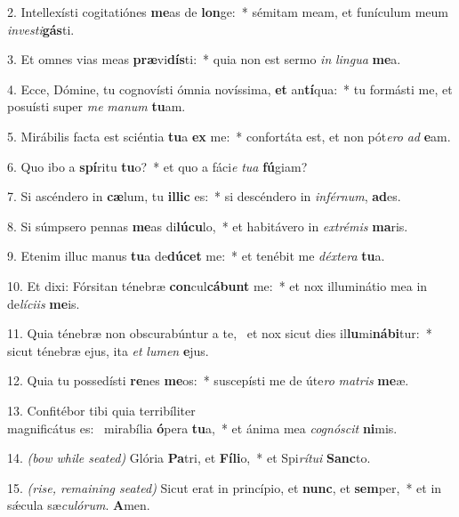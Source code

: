 	2. Intellexísti cogitatiónes \textbf{me}as de \textbf{lon}ge:~* sémitam meam, et funículum meum\\ \textit{in}\textit{ves}\textit{ti}\textbf{gás}ti.

	3. Et omnes vias meas \textbf{præ}vi\textbf{dís}ti:~* quia non est sermo \textit{in} \textit{lin}\textit{gua} \textbf{me}a.

	4. Ecce, Dómine, tu cognovísti ómnia novíssima, \textbf{et} an\textbf{tí}qua:~* tu formásti me, et posuísti super \textit{me} \textit{ma}\textit{num} \textbf{tu}am.

	5. Mirábilis facta est sciéntia \textbf{tu}a \textbf{ex} me:~* confortáta est, et non pót\textit{e}\textit{ro} \textit{ad} \textbf{e}am.

	6. Quo ibo a \textbf{spí}ritu \textbf{tu}o?~* et quo a fáci\textit{e} \textit{tu}\textit{a} \textbf{fú}giam?

	7. Si ascéndero in \textbf{cæ}lum, tu \textbf{il}\textbf{lic} es:~* si descéndero in \textit{in}\textit{fér}\textit{num}, \textbf{ad}es.

	8. Si súmpsero pennas \textbf{me}as di\textbf{lú}\textbf{cu}lo,~* et habitávero in \textit{ex}\textit{tré}\textit{mis} \textbf{ma}ris.

	9. Etenim illuc manus \textbf{tu}a de\textbf{dú}\textbf{cet} me:~* et tenébit me \textit{déx}\textit{te}\textit{ra} \textbf{tu}a.

	10. Et dixi: Fórsitan ténebræ \textbf{con}cul\textbf{cá}\textbf{bunt} me:~* et nox illuminátio mea in de\textit{lí}\textit{ci}\textit{is} \textbf{me}is.

	11. Quia ténebræ non obscurabúntur a te,~{\color{red}\GreDagger} et nox sicut dies il\textbf{lu}mi\textbf{ná}\textbf{bi}tur:~* sicut ténebræ ejus, ita \textit{et} \textit{lu}\textit{men} \textbf{e}jus.

	12. Quia tu possedísti \textbf{re}nes \textbf{me}os:~* suscepísti me de úte\textit{ro} \textit{ma}\textit{tris} \textbf{me}æ.

	13. Confitébor tibi quia terribíliter\\ magnificátus es:~{\color{red}\GreDagger} mirabília \textbf{ó}pera \textbf{tu}a,~* et ánima mea \textit{co}\textit{gnó}\textit{scit} \textbf{ni}mis.

	14. {\color{red}\textit{(bow while seated)}} Glória \textbf{Pa}tri, et \textbf{Fí}\textbf{li}o,~* et Spi\textit{rí}\textit{tu}\textit{i} \textbf{Sanc}to.

	15. {\color{red}\textit{(rise, remaining seated)}} Sicut erat in princípio, et \textbf{nunc}, et \textbf{sem}per,~* et in s\'{\ae}cula sæ\textit{cu}\textit{ló}\textit{rum}. \textbf{A}men.